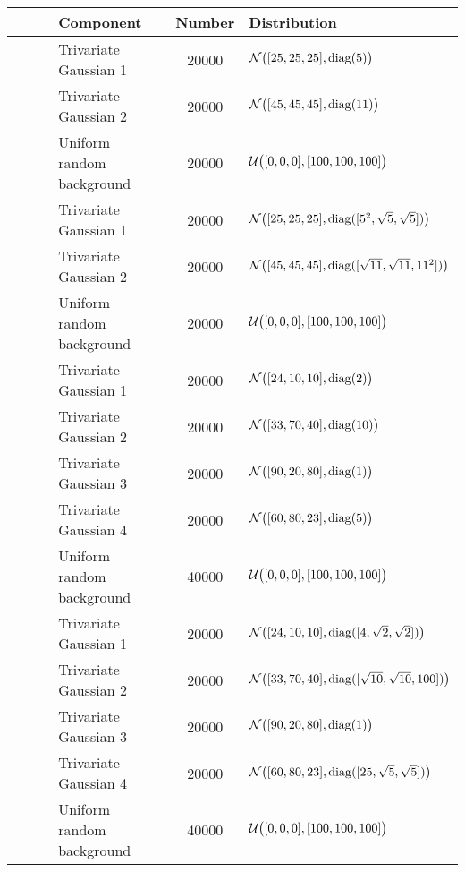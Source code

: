 \small
{}
\begin{tabular}{@{}cclSl@{}}
\toprule
 				&~						& Component					& {Number} 	& Distribution\\
\midrule
\ferdosiTwo 	&\legendComponentOne	& Trivariate Gaussian 1		& 20000		& $\mathcal{N}\big([25, 25, 25], \operatorname{diag}(5)\big)$\\
~ 				&\legendComponentTwo	& Trivariate Gaussian 2		& 20000		& $\mathcal{N}\big([45, 45, 45], \operatorname{diag}(11)\big)$\\
~ 				&\legendComponentNoise	& Uniform random background	& 20000		& $\mathcal{U}\big([0, 0, 0], [100, 100, 100]\big)$\\
\hline
\baakmanTwo		&\legendComponentOne	& Trivariate Gaussian 1		& 20000		& $\mathcal{N}\big([25, 25, 25], \operatorname{diag}([5^2, \sqrt{5}, \sqrt{5}])\big)$\\
~ 				&\legendComponentTwo	& Trivariate Gaussian 2		& 20000		& $\mathcal{N}\big([45, 45, 45], \operatorname{diag}([\sqrt{11}, \sqrt{11}, 11^2])\big)$\\
~ 				&\legendComponentNoise	& Uniform random background	& 20000		& $\mathcal{U}\big([0, 0, 0], [100, 100, 100]\big)$\\
\hline
\ferdosiThree	&\legendComponentOne 	& Trivariate Gaussian 1 	& 20000		& $\mathcal{N}\big([24, 10, 10], \operatorname{diag}(2)\big)$\\
~ 				&\legendComponentTwo	& Trivariate Gaussian 2 	& 20000		& $\mathcal{N}\big([33, 70, 40], \operatorname{diag}(10)\big)$\\
~ 				&\legendComponentThree	& Trivariate Gaussian 3 	& 20000		& $\mathcal{N}\big([90, 20, 80], \operatorname{diag}(1)\big)$\\
~ 				&\legendComponentFour	& Trivariate Gaussian 4 	& 20000		& $\mathcal{N}\big([60, 80, 23], \operatorname{diag}(5)\big)$\\
~ 				&\legendComponentNoise	& Uniform random background	& 40000		& $\mathcal{U}\big([0, 0, 0], [100, 100, 100]\big)$\\
\hline
\baakmanThree	&\legendComponentOne 	& Trivariate Gaussian 1 	& 20000		& $\mathcal{N}\big([24, 10, 10], \operatorname{diag}([4, \sqrt{2}, \sqrt{2}])\big)$\\
~ 				&\legendComponentTwo	& Trivariate Gaussian 2 	& 20000		& $\mathcal{N}\big([33, 70, 40], \operatorname{diag}([\sqrt{10}, \sqrt{10}, 100])\big)$\\
~ 				&\legendComponentThree	& Trivariate Gaussian 3 	& 20000		& $\mathcal{N}\big([90, 20, 80], \operatorname{diag}(1)\big)$\\
~ 				&\legendComponentFour	& Trivariate Gaussian 4 	& 20000		& $\mathcal{N}\big([60, 80, 23], \operatorname{diag}([25, \sqrt{5}, \sqrt{5}])\big)$\\
~ 				&\legendComponentNoise	& Uniform random background	& 40000		& $\mathcal{U}\big([0, 0, 0], [100, 100, 100]\big)$\\
\bottomrule
\end{tabular}